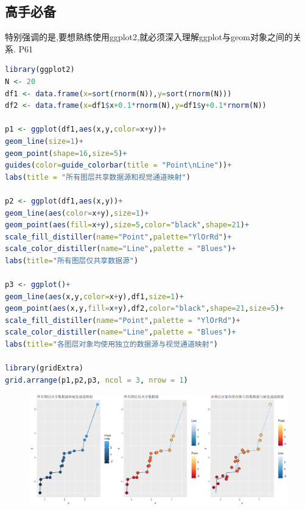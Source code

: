 \documentclass[11pt,a4paper,oneside]{book}
\begin{document}
\subsection{高手必备}
特别强调的是,要想熟练使用ggplot2,就必须深入理解ggplot与geom对象之间的关系. P61
\begin{lstlisting}[language=r]
library(ggplot2)
N <- 20
df1 <- data.frame(x=sort(rnorm(N)),y=sort(rnorm(N)))
df2 <- data.frame(x=df1$x+0.1*rnorm(N),y=df1$y+0.1*rnorm(N))

p1 <- ggplot(df1,aes(x,y,color=x+y))+
geom_line(size=1)+
geom_point(shape=16,size=5)+
guides(color=guide_colorbar(title = "Point\nLine"))+
labs(title = "所有图层共享数据源和视觉通道映射")

p2 <- ggplot(df1,aes(x,y))+
geom_line(aes(color=x+y),size=1)+
geom_point(aes(fill=x+y),size=5,color="black",shape=21)+
scale_fill_distiller(name="Point",palette="YlOrRd")+
scale_color_distiller(name="Line",palette = "Blues")+
labs(title="所有图层仅共享数据源")

p3 <- ggplot()+
geom_line(aes(x,y,color=x+y),df1,size=1)+
geom_point(aes(x,y,fill=x+y),df2,color="black",shape=21,size=5)+
scale_fill_distiller(name="Point",palette = "YlOrRd")+
scale_color_distiller(name="Line",palette = "Blues")+
labs(title="各图层对象均使用独立的数据源与视觉通道映射")

library(gridExtra) 
grid.arrange(p1,p2,p3, ncol = 3, nrow = 1)
\end{lstlisting}
\begin{figure}[H]
	\centering
	\includegraphics[width=\textwidth]{screenshot044}
\end{figure}
\end{document}
